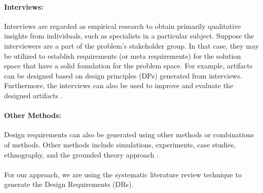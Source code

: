 \paragraph*{Interviews:}
Interviews are regarded as empirical research to obtain primarily qualitative insights from individuals, such as specialists in a particular subject. 
Suppose the interviewers are a part of the problem's stakeholder group.
In that case, they may be utilized to establish requirements (or meta requirements) for the solution space that have a solid foundation for the problem space.
For example, artifacts can be designed based on design principles (DPs) generated from interviews.
Furthermore, the interviews can also be used to improve and evaluate the designed artifacts \cite{misc:dsr:mayring}. 

\paragraph*{Other Methods:}
Design requirements can also be generated using other methods or combinations of methods.
Other methods include simulations, experiments, case studies, ethnography, and the grounded theory approach \cite{misc:dsr:nickerson, misc:dsr:varshney}. \\\\
For our approach, we are using the systematic literature review technique to generate the Design Requirements (DRs).
